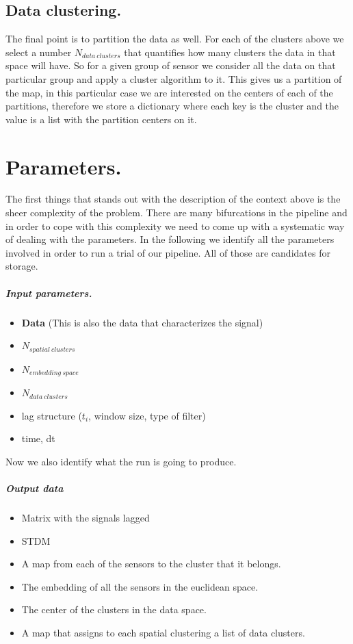 \documentclass[11pt,a4paper]{article}
\begin{document}
\subsection{Data clustering.}\label{data-clustering.}

The final point is to partition the data as well. For each of the
clusters above we select a number \(N_{data\:clusters}\) that quantifies
how many clusters the data in that space will have. So for a given group
of sensor we consider all the data on that particular group and apply a
cluster algorithm to it. This gives us a partition of the map, in this particular case we are interested on the centers of each of the partitions, therefore we store a dictionary where each key is the cluster and the value is a list with the partition centers on it.

\section{Parameters.}\label{parameters.}

The first things that stands out with the description of the context above is the sheer
complexity of the problem. There are many bifurcations in the pipeline
and in order to cope with this complexity we need to come up with a
systematic way of dealing with the parameters. In the following we
identify all the parameters involved in order to run a trial of our pipeline. All of those are candidates for storage.

\subparagraph{Input parameters.}\label{input-parameters.}

\begin{itemize}
\item
  \textbf{Data} (This is also the data that characterizes the signal)
\item
  \(N_{spatial\:clusters}\)
\item
  \(N_{embedding\: space}\)
\item
  \(N_{data\: clusters}\)
\item
  lag structure ($t_i$, window size, type of filter)
\item
  time, dt
\end{itemize}

Now we also identify what the run is going to produce. 

\subparagraph{Output data}\label{output-data-to-visualize.}

\begin{itemize}
\item
  Matrix with the signals lagged
\item
  STDM
\item
  A map from each of the sensors to the cluster that it belongs.
\item
  The embedding of all the sensors in the euclidean space.
\item
  The center of the clusters in the data space.
\item
  A map that assigns to each spatial clustering a list of data clusters.
\end{itemize}
\end{document}
